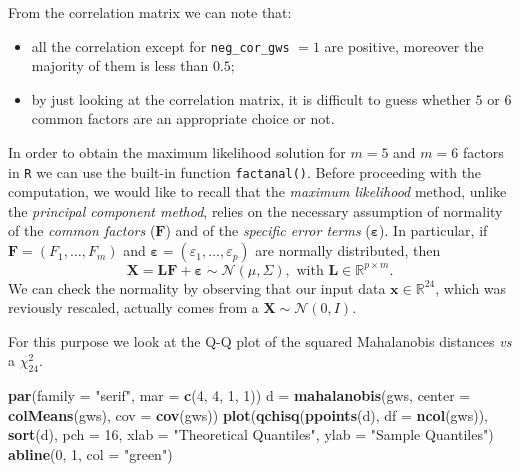 \documentclass[
]{article}
\newenvironment{Shaded}{\begin{snugshade}}{\end{snugshade}}
\newcommand{\AttributeTok}[1]{\textcolor[rgb]{0.13,0.29,0.53}{#1}}
\newcommand{\DecValTok}[1]{\textcolor[rgb]{0.00,0.00,0.81}{#1}}
\newcommand{\FunctionTok}[1]{\textcolor[rgb]{0.13,0.29,0.53}{\textbf{#1}}}
\newcommand{\NormalTok}[1]{#1}
\newcommand{\OtherTok}[1]{\textcolor[rgb]{0.56,0.35,0.01}{#1}}
\newcommand{\StringTok}[1]{\textcolor[rgb]{0.31,0.60,0.02}{#1}}
\theoremstyle{plain}
\begin{document}
From the correlation matrix we can note that:

\begin{itemize}
    \item
        all the correlation except for \texttt{neg\_cor\_gws} $= 1$ are positive, moreover the majority of them is less than $0.5$;
    \item
        by just looking at the correlation matrix, it is difficult to guess whether $5$ or $6$ common factors are an appropriate choice or not.
\end{itemize}

In order to obtain the maximum likelihood solution for \(m = 5\) and
\(m = 6\) factors in \texttt{R} we can use the built-in function
\texttt{factanal()}. \newline Before proceeding with the computation, we
would like to recall that the \textit{maximum likelihood} method, unlike
the \textit{principal component method}, relies on the necessary
assumption of normality of the \textit{common factors}
(\(\boldsymbol{F}\)) and of the \textit{specific error terms}
(\(\boldsymbol{\varepsilon}\)). In particular, if
\(\boldsymbol{F} = (F_1, \dots, F_m)\) and
\(\boldsymbol{\varepsilon} = (\varepsilon_1, \dots, \varepsilon_p)\) are
normally distributed, then \[
    \boldsymbol{X} = \boldsymbol{L} \boldsymbol{F} + \boldsymbol{\varepsilon} \sim \mathcal{N}\left(\mu,\Sigma\right), \text{ with } \boldsymbol{L} \in \mathbb{R}^{p \times m}.
\] We can check the normality by observing that our input data
\(\boldsymbol{x} \in \mathbb{R}^{24}\), which was reviously rescaled,
actually comes from a
\(\boldsymbol{X} \sim \mathcal{N}\left(0,I\right)\).

For this purpose we look at the Q-Q plot of the squared Mahalanobis
distances \textit{vs} a \(\chi^2_{24}\).

\smallskip

\begin{Shaded}
\begin{Highlighting}[]
\FunctionTok{par}\NormalTok{(}\AttributeTok{family =} \StringTok{"serif"}\NormalTok{, }\AttributeTok{mar =} \FunctionTok{c}\NormalTok{(}\DecValTok{4}\NormalTok{, }\DecValTok{4}\NormalTok{, }\DecValTok{1}\NormalTok{, }\DecValTok{1}\NormalTok{))}
\NormalTok{d }\OtherTok{=} \FunctionTok{mahalanobis}\NormalTok{(gws, }\AttributeTok{center =} \FunctionTok{colMeans}\NormalTok{(gws), }\AttributeTok{cov =} \FunctionTok{cov}\NormalTok{(gws))}
\FunctionTok{plot}\NormalTok{(}\FunctionTok{qchisq}\NormalTok{(}\FunctionTok{ppoints}\NormalTok{(d), }\AttributeTok{df =} \FunctionTok{ncol}\NormalTok{(gws)), }\FunctionTok{sort}\NormalTok{(d), }\AttributeTok{pch =} \DecValTok{16}\NormalTok{,}
    \AttributeTok{xlab =} \StringTok{"Theoretical Quantiles"}\NormalTok{, }\AttributeTok{ylab =} \StringTok{"Sample Quantiles"}\NormalTok{)}
\FunctionTok{abline}\NormalTok{(}\DecValTok{0}\NormalTok{, }\DecValTok{1}\NormalTok{, }\AttributeTok{col =} \StringTok{"green"}\NormalTok{)}
\end{Highlighting}
\end{Shaded}
\end{document}
